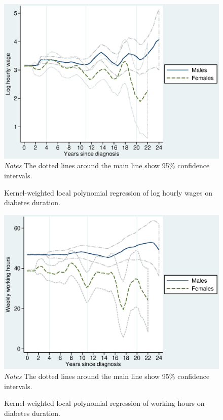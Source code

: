 \newpage
\begin{figure}[h!]
\caption{\label{fig:Kernel-weighted-local-polynomial_wage}Kernel-weighted local
polynomial regression of log hourly wages on diabetes duration.}%
\begin{center}
\includegraphics[width=\linewidth]{Chapter4/Figures/lpoly_wage_diabetesduration.eps}\\
\footnotesize{\textit{Notes} The dotted lines around the main line show 95\% confidence intervals.}
\end{center}
\end{figure}

\newpage
\begin{figure}[h!]
\caption{\label{fig:Kernel-weighted-local-polynomial_workhrs}Kernel-weighted local
polynomial regression of working hours on diabetes duration.}%
\begin{center}
\includegraphics[width=\linewidth]{Chapter4/Figures/lpoly_workhrs_diabetesduration.eps}\\
\footnotesize{\textit{Notes} The dotted lines around the main line show 95\% confidence intervals.}
\end{center}
\end{figure}
\clearpage





